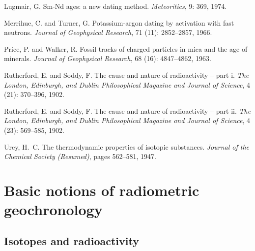 \documentclass{book}
\begin{document}
\begin{thebibliography}{16}
Lugmair, G.
\newblock Sm-Nd ages: a new dating method.
\newblock \emph{Meteoritics}, 9: 369, 1974.

Merrihue, C. and Turner, G.
\newblock Potassium-argon dating by activation with fast neutrons.
\newblock \emph{Journal of Geophysical Research}, 71 (11):
  2852--2857, 1966.

Price, P. and Walker, R.
\newblock Fossil tracks of charged particles in mica and the age of minerals.
\newblock \emph{Journal of Geophysical Research}, 68 (16):
  4847--4862, 1963.

Rutherford, E. and Soddy, F.
\newblock The cause and nature of radioactivity -- part i.
\newblock \emph{The London, Edinburgh, and Dublin Philosophical Magazine and
  Journal of Science}, 4 (21): 370--396, 1902{}.

Rutherford, E. and Soddy, F.
\newblock The cause and nature of radioactivity -- part ii.
\newblock \emph{The London, Edinburgh, and Dublin Philosophical Magazine and
  Journal of Science}, 4 (23): 569--585, 1902{}.

Urey, H.~C.
\newblock The thermodynamic properties of isotopic substances.
\newblock \emph{Journal of the Chemical Society (Resumed)}, pages 562--581,
  1947.

\end{thebibliography}


%
%

\chapter[Basic Notions]{Basic notions of radiometric geochronology}
\label{sec:basic-notions}

\section{Isotopes and radioactivity}
\label{sec:isotopes}
\end{document}

